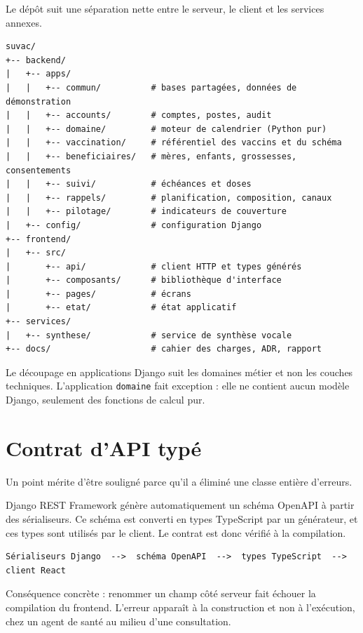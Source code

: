 \documentclass[11pt,a4paper]{report}
\begin{document}
Le dépôt suit une séparation nette entre le serveur, le client et les
services annexes.

\begin{lstlisting}
suvac/
+-- backend/
|   +-- apps/
|   |   +-- commun/          # bases partagées, données de démonstration
|   |   +-- accounts/        # comptes, postes, audit
|   |   +-- domaine/         # moteur de calendrier (Python pur)
|   |   +-- vaccination/     # référentiel des vaccins et du schéma
|   |   +-- beneficiaires/   # mères, enfants, grossesses, consentements
|   |   +-- suivi/           # échéances et doses
|   |   +-- rappels/         # planification, composition, canaux
|   |   +-- pilotage/        # indicateurs de couverture
|   +-- config/              # configuration Django
+-- frontend/
|   +-- src/
|       +-- api/             # client HTTP et types générés
|       +-- composants/      # bibliothèque d'interface
|       +-- pages/           # écrans
|       +-- etat/            # état applicatif
+-- services/
|   +-- synthese/            # service de synthèse vocale
+-- docs/                    # cahier des charges, ADR, rapport
\end{lstlisting}

Le découpage en applications Django suit les domaines métier et non les
couches techniques. L'application \texttt{domaine} fait exception : elle ne
contient aucun modèle Django, seulement des fonctions de calcul pur.

\section{Contrat d'API typé}

Un point mérite d'être souligné parce qu'il a éliminé une classe entière
d'erreurs.

Django REST Framework génère automatiquement un schéma OpenAPI à partir des
sérialiseurs. Ce schéma est converti en types TypeScript par un générateur,
et ces types sont utilisés par le client. Le contrat est donc vérifié à la
compilation.

\begin{lstlisting}
Sérialiseurs Django  -->  schéma OpenAPI  -->  types TypeScript  -->  client React
\end{lstlisting}

Conséquence concrète : renommer un champ côté serveur fait échouer la
compilation du frontend. L'erreur apparaît à la construction et non à
l'exécution, chez un agent de santé au milieu d'une consultation.
\end{document}
